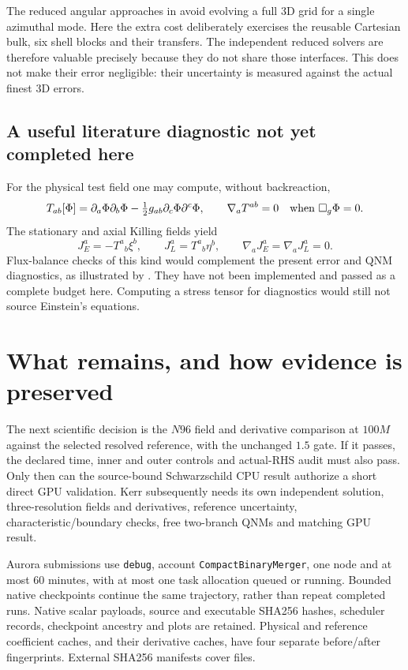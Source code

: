 \documentclass[11pt,letterpaper]{article}
\begin{document}
The reduced angular approaches in \cite{tails,macedo} avoid evolving a full 3D grid for a single azimuthal mode. Here the extra cost deliberately exercises the reusable Cartesian bulk, six shell blocks and their transfers. The independent reduced solvers are therefore valuable precisely because they do not share those interfaces. This does not make their error negligible: their uncertainty is measured against the actual finest 3D errors.

\clearpage
\subsection{A useful literature diagnostic not yet completed here}
For the physical test field one may compute, without backreaction,
\begin{equation}
 T_{ab}[\Phi]=\partial_a\Phi\partial_b\Phi-\tfrac12g_{ab}\partial_c\Phi\partial^c\Phi,
 \qquad \nabla_aT^{ab}=0\quad\hbox{when }\Box_g\Phi=0.
\end{equation}
The stationary and axial Killing fields yield
\begin{equation}
 J_E^a=-T^a{}_b\xi^b,\qquad J_L^a=T^a{}_b\eta^b,\qquad
 \nabla_aJ_E^a=\nabla_aJ_L^a=0.
\end{equation}
Flux-balance checks of this kind would complement the present error and QNM diagnostics, as illustrated by \cite{tails}. They have not been implemented and passed as a complete budget here. Computing a stress tensor for diagnostics would still not source Einstein's equations.

\section{What remains, and how evidence is preserved}
The next scientific decision is the $N96$ field and derivative comparison at $100M$ against the selected resolved reference, with the unchanged $1.5$ gate. If it passes, the declared time, inner and outer controls and actual-RHS audit must also pass. Only then can the source-bound Schwarzschild CPU result authorize a short direct GPU validation. Kerr subsequently needs its own independent solution, three-resolution fields and derivatives, reference uncertainty, characteristic/boundary checks, free two-branch QNMs and matching GPU result.

Aurora submissions use \texttt{debug}, account \texttt{CompactBinaryMerger}, one node and at most 60 minutes, with at most one task allocation queued or running. Bounded native checkpoints continue the same trajectory, rather than repeat completed runs. Native scalar payloads, source and executable SHA256 hashes, scheduler records, checkpoint ancestry and plots are retained. Physical and reference coefficient caches, and their derivative caches, have four separate before/after fingerprints. External SHA256 manifests cover files.
\end{document}
